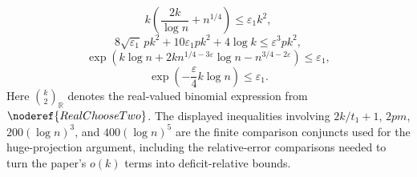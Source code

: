 \begin{definition}
\[\]
\[
k\left(\frac{2k}{\log n}+n^{1/4}\right)\le \varepsilon_1k^2,
\]
\[
8\sqrt{\varepsilon_1}\,pk^2+10\varepsilon_1pk^2+4\log k
  \le \varepsilon^3pk^2,
\]
\[
\exp\!\left(k\log n+2kn^{1/4-3\varepsilon}\log n
  -n^{3/4-2\varepsilon}\right)\le \varepsilon_1,
\]
\[
\exp\!\left(-\frac{\varepsilon}{4}k\log n\right)\le \varepsilon_1.
\]
Here \(\binom{k}{2}_{\mathbb R}\) denotes the real-valued binomial expression
from \(\noderef{RealChooseTwo}\).  The displayed inequalities involving
\(2k/t_1+1\), \(2pm\), \(200(\log n)^3\), and \(400(\log n)^5\) are the finite
comparison conjuncts used for the huge-projection argument, including the
relative-error comparisons needed to turn the paper's \(o(k)\) terms into
deficit-relative bounds.
\end{definition}
